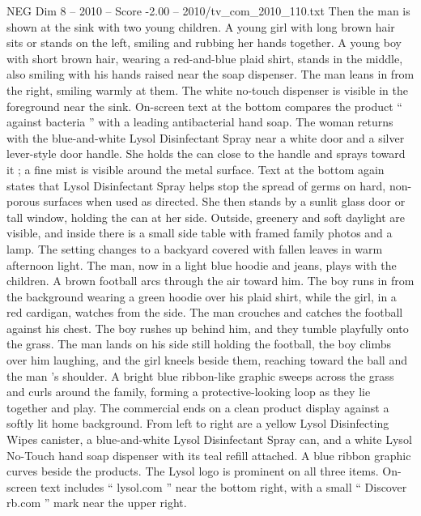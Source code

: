 \begin{textsample}{NEG Dim 8 – 2010 – Score -2.00 – 2010/tv\_com\_2010\_110.txt}
Then the man is shown at the sink with two young children.
A young girl with long brown hair sits or stands on the left, smiling and rubbing her hands together.
A young boy with short brown hair, wearing a red-and-blue plaid shirt, stands in the middle, also smiling with his hands raised near the soap dispenser.
The man leans in from the right, smiling warmly at them.
The white no-touch dispenser is visible in the foreground near the sink.
On-screen text at the bottom compares the product “ against bacteria ” with a leading antibacterial hand soap.
The woman returns with the blue-and-white Lysol Disinfectant Spray near a white door and a silver lever-style door handle.
She holds the can close to the handle and sprays toward it ; a fine mist is visible around the metal surface.
Text at the bottom again states that Lysol Disinfectant Spray helps stop the spread of germs on hard, non-porous surfaces when used as directed.
She then stands by a sunlit glass door or tall window, holding the can at her side.
Outside, greenery and soft daylight are visible, and inside there is a small side table with framed family photos and a lamp.
The setting changes to a backyard covered with fallen leaves in warm afternoon light.
The man, now in a light blue hoodie and jeans, plays with the children.
A brown football arcs through the air toward him.
The boy runs in from the background wearing a green hoodie over his plaid shirt, while the girl, in a red cardigan, watches from the side.
The man crouches and catches the football against his chest.
The boy rushes up behind him, and they tumble playfully onto the grass.
The man lands on his side still holding the football, the boy climbs over him laughing, and the girl kneels beside them, reaching toward the ball and the man ’s shoulder.
A bright blue ribbon-like graphic sweeps across the grass and curls around the family, forming a protective-looking loop as they lie together and play.
The commercial ends on a clean product display against a softly lit home background.
From left to right are a yellow Lysol Disinfecting Wipes canister, a blue-and-white Lysol Disinfectant Spray can, and a white Lysol No-Touch hand soap dispenser with its teal refill attached.
A blue ribbon graphic curves beside the products.
The Lysol logo is prominent on all three items.
On-screen text includes “ lysol.com ” near the bottom right, with a small “ Discover rb.com ” mark near the upper right.

\end{textsample}
